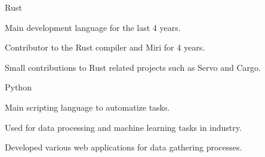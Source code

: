 


\begin{cvskills}


\cvskill
{Rust} %
{
    \begin{cvitems}
    \item Main development language for the last 4 years.
    \item Contributor to the Rust compiler and Miri for 4 years.
    \item Small contributions to Rust related projects such as Servo and Cargo.
    \end{cvitems}
}


\cvskill
{Python}
{
    \begin{cvitems}
    \item Main scripting language to automatize tasks.
    \item Used for data processing and machine learning tasks in industry.
    \item Developed various web applications for data gathering processes.
    \end{cvitems}
}
\vspace{-.5cm}
\vspace{-.5cm}

\end{cvskills}
